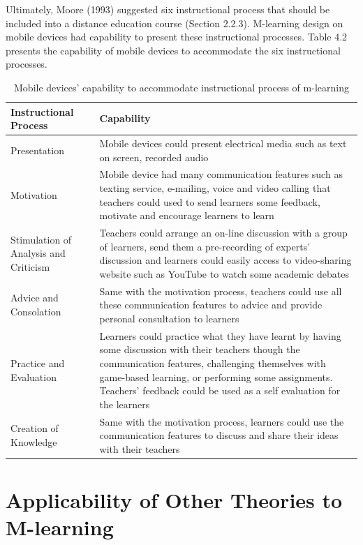 Ultimately, Moore (1993) \cite{moore1993theory} suggested six instructional process that should be included into a distance education course (Section 2.2.3). M-learning design on mobile devices had capability to present these instructional processes. Table 4.2 presents the capability of mobile devices to accommodate the six instructional processes. 
\newpage 
\begin{table}[!htb]
\centering
\caption{Mobile devices' capability to accommodate instructional process of m-learning}
\begin{tabular}{ |p{2.6 cm}|p{9.9 cm}|} 
 \hline
Instructional Process \cite{moore1993theory} & Capability \\ 
\hline
Presentation & Mobile devices could present electrical media such as text on screen, recorded audio  \\ 
\hline
Motivation & Mobile device had many communication features such as texting service, e-mailing, voice and video calling that teachers could used to send learners some feedback, motivate and encourage learners to learn \\ 
 \hline
Stimulation of Analysis and Criticism & Teachers could arrange an on-line discussion with a group of learners, send them a pre-recording of experts' discussion and learners could easily access to video-sharing website such as YouTube to watch some academic debates \\ 
\hline
Advice and Consolation & Same with the motivation process, teachers could use all these communication features to advice and provide personal consultation to learners   \\ 
 \hline
Practice and Evaluation & Learners could practice what they have learnt by having some discussion with their teachers though the communication features, challenging themselves with game-based learning, or performing some assignments. Teachers' feedback could be used as a self evaluation for the learners \\ 
 \hline
Creation of Knowledge &  Same with the motivation process, learners could use the communication features to discuss and share their ideas with their teachers \\ 
 \hline
\end{tabular}
\end{table}


\section{Applicability of Other Theories to M-learning} 

